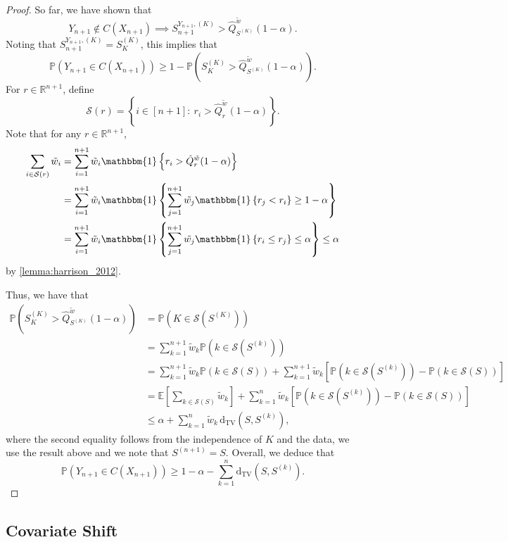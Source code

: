 \documentclass[11pt, titlepage]{article} %
\newcommand{\R}{\mathrm}
\newcommand{\Prob}[1]{\mathbb{P}\left( #1 \right)}
\newcommand{\Exp}[3]{\mathbb{E}\left#2 #1 \right#3}
\newcommand{\Ind}[1]{\mathbbm{1}\left\{ #1 \right\}}
\numberwithin{equation}{section}
\theoremstyle{definition}
\numberwithin{theorem}{section}
\numberwithin{lemma}{section}
\numberwithin{corollary}{section}
\numberwithin{proposition}{section}
\numberwithin{definition}{section}
\numberwithin{remark}{section}
\begin{document}
\begin{proof}
    \noindent
    So far, we have shown that \[Y_{n+1} \not \in C(X_{n+1}) \implies S_{n+1}^{Y_{n+1}, (K)} >\hat{Q}^{\tilde{w}}_{S^{(K)}}(1-\alpha).\] Noting that \(S_{n+1}^{Y_{n+1}, (K)} = S_K^{(K)}\), this implies that \[\Prob{Y_{n+1} \in C(X_{n+1}) } \geq 1 - \Prob{ S_K^{(K)} > \hat{Q}^{\tilde{w}}_{S^{(K)}}(1-\alpha) }. \]
    \noindent
    For \(r \in \mathbb{R}^{n+1}\), define \[\mathcal{S}(r) = \left\{ i \in [n+1]: \ r_i > \hat{Q}^{\tilde{w}}_r(1-\alpha) \right\}.\] Note that for any \(r \in \mathbb{R}^{n+1}\), \begin{align*}
        \sum_{i \in \mathcal{S}(r)} \tilde{w}_i &= \sum_{i=1}^{n+1} \tilde{w}_i \Ind{r_i > \hat{Q}^{\tilde{w}}_r(1-\alpha)} \\
        &= \sum_{i=1}^{n+1} \tilde{w}_i \Ind{\sum_{j=1}^{n+1} \tilde{w_j} \Ind{r_j < r_i} \geq 1-\alpha} \\
        &= \sum_{i=1}^{n+1} \tilde{w}_i \Ind{\sum_{j=1}^{n+1} \tilde{w_j} \Ind{r_i \leq r_j} \leq \alpha} \leq \alpha
    \end{align*} by \cref{lemma:harrison_2012}. \vskip5pt
    
    \noindent
    Thus, we have that \begin{align*}
        \Prob{ S_K^{(K)} > \hat{Q}^{\tilde{w}}_{S^{(K)}}(1-\alpha) } &= \Prob{K \in \mathcal{S}(S^{(K)})} \\
        &= \sum_{k=1}^{n+1} \tilde{w}_k \Prob{k \in \mathcal{S}(S^{(k)})} \\
        &= \sum_{k=1}^{n+1} \tilde{w}_k \Prob{k \in \mathcal{S}(S)} + \sum_{k=1}^{n+1} \tilde{w}_k \left[\Prob{k \in \mathcal{S}(S^{(k)})} - \Prob{k \in \mathcal{S}(S)} \right] \\
        &= \Exp{\sum_{k \in \mathcal{S}(S)} \tilde{w}_k }{[}{]} + \sum_{k=1}^{n} \tilde{w}_k \left[\Prob{k \in \mathcal{S}(S^{(k)})} - \Prob{k \in \mathcal{S}(S)} \right] \\
        &\leq \alpha + \sum_{k=1}^n \tilde{w}_k \, \R{d_{TV}}(S, S^{(k)}),
    \end{align*} where the second equality follows from the independence of \(K\) and the data, we use the result above and we note that \(S^{(n+1)} = S\). Overall, we deduce that \[\Prob{Y_{n+1} \in C(X_{n+1})}  \geq 1-\alpha - \sum_{k=1}^n \R{d_{TV}}(S, S^{(k)}).\]

\end{proof}


\subsection{Covariate Shift}
\end{document}
